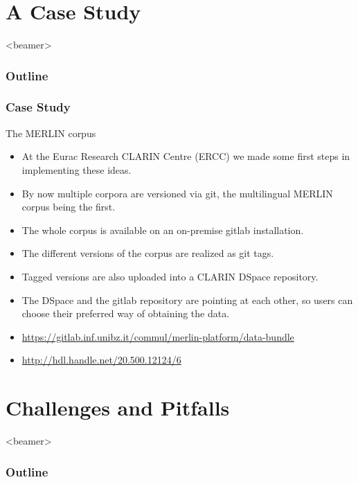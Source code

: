 \section[p.three]{A Case Study}
{%
\begin{frame}<beamer>
    \frametitle{Outline}
\tableofcontents[currentsection]
\end{frame}
}

    \begin{frame}
        \frametitle{Case Study}
        \begin{block}{The MERLIN corpus}
            \begin{itemize}
				\item At the Eurac Research CLARIN Centre (ERCC) we made some first steps in implementing these ideas.
				\pause
				\item By now multiple corpora are versioned via git, the multilingual MERLIN corpus being the first.
				\pause
				\item The whole corpus is available on an on-premise gitlab installation.
				\pause
				\item The different versions of the corpus are realized as git tags.
				\pause
				\item Tagged versions are also uploaded into a CLARIN DSpace repository.
				\pause
				\item The DSpace and the gitlab repository are pointing at each other, so users can choose their preferred way of obtaining the data.
				\pause
				\item {\small \url{https://gitlab.inf.unibz.it/commul/merlin-platform/data-bundle}}
				\pause
				\item \url{http://hdl.handle.net/20.500.12124/6}
     		\end{itemize}
        \end{block}
    \end{frame}

\section[p.four]{Challenges and Pitfalls}
{%
\begin{frame}<beamer>
    \frametitle{Outline}
\tableofcontents[currentsection]
\end{frame}
}

